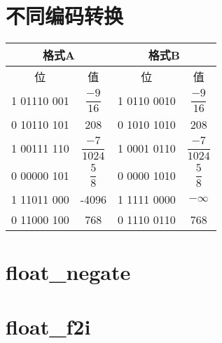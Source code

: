 \documentclass[11pt,a4paper]{ctexart}
\begin{document}
\section{不同编码转换}
\begin{tabular}{|c|c|c|c|}
	\hline 
	\multicolumn{2}{|c|}{格式A} & \multicolumn{2}{|c|}{格式B} \\ 
	\hline 
	位 & 值 & 位 & 值 \\ 
	\hline 
	1 01110 001 & $\dfrac{-9}{16}$ & 1 0110 0010 & $\dfrac{-9}{16}$ \\ 
	\hline 
	0 10110 101 & 208 & 0 1010 1010 & 208 \\ 
	\hline 
	1 00111 110 & $\dfrac{-7}{1024}$ & 1 0001 0110 & $\dfrac{-7}{1024}$ \\ 
	\hline 
	0 00000 101 & $\dfrac{5}{8}$ & 0 0000 1010 & $\dfrac{5}{8}$ \\ 
	\hline 
	1 11011 000 & -4096 & 1 1111 0000 & $-\infty $ \\ 
	\hline 
	0 11000 100 & 768 & 0 1110 0110 & 768 \\ 
	\hline 
\end{tabular} 

\section{float\_negate}


\section{float\_f2i}

\end{document}

